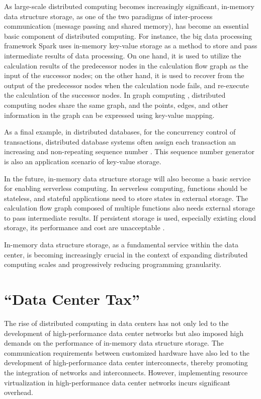 As large-scale distributed computing becomes increasingly significant, in-memory data structure storage, as one of the two paradigms of inter-process communication (message passing and shared memory), has become an essential basic component of distributed computing.
For instance, the big data processing framework Spark uses in-memory key-value storage as a method to store and pass intermediate results of data processing. On one hand, it is used to utilize the calculation results of the predecessor nodes in the calculation flow graph as the input of the successor nodes; on the other hand, it is used to recover from the output of the predecessor nodes when the calculation node fails, and re-execute the calculation of the successor nodes.
In graph computing \cite{wu2015g,xiao17tux2}, distributed computing nodes share the same graph, and the points, edges, and other information in the graph can be expressed using key-value mapping.

As a final example, in distributed databases, for the concurrency control of transactions, distributed database systems often assign each transaction an increasing and non-repeating sequence number \cite{li2017eris}. This sequence number generator is also an application scenario of key-value storage.

In the future, in-memory data structure storage will also become a basic service for enabling serverless computing. In serverless computing, functions should be stateless, and stateful applications need to store states in external storage. The calculation flow graph composed of multiple functions also needs external storage to pass intermediate results. If persistent storage is used, especially existing cloud storage, its performance and cost are unacceptable \cite{jonas2019cloud}.

In-memory data structure storage, as a fundamental service within the data center, is becoming increasingly crucial in the context of expanding distributed computing scales and progressively reducing programming granularity.

\section{``Data Center Tax''}
\label{background:sec:datacenter-tax}

The rise of distributed computing in data centers has not only led to the development of high-performance data center networks but also imposed high demands on the performance of in-memory data structure storage. The communication requirements between customized hardware have also led to the development of high-performance data center interconnects, thereby promoting the integration of networks and interconnects. However, implementing resource virtualization in high-performance data center networks incurs significant overhead. 

